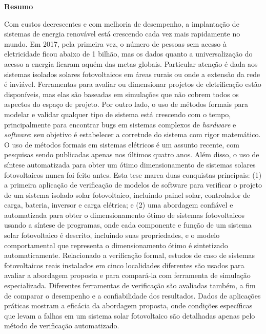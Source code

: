 \thispagestyle{plain}
\begin{center}
%    
%    
%    
    \vspace{0.9cm}
    \textbf{Resumo}
\end{center}
Com custos decrescentes e com melhoria de desempenho, a implantação de sistemas de energia renovável está crescendo cada vez mais rapidamente no mundo. Em 2017, pela primeira vez, o número de pessoas sem acesso à eletricidade ficou abaixo de 1 bilhão, mas os dados quanto a universalização do acesso a energia ficaram aquém das metas globais. Particular atenção é dada aos sistemas isolados solares fotovoltaicos em áreas rurais ou onde a extensão da rede é inviável. 
Ferramentas para avaliar ou dimensionar projetos de eletrificação estão disponíveis, mas elas são baseadas em simulações que não cobrem todos os aspectos do espaço de projeto. Por outro lado, o uso de métodos formais para modelar e validar qualquer tipo de sistema está crescendo com o tempo, principalmente para encontrar bugs em sistemas complexos de \textit{hardware} e \textit{software}: seu objetivo é estabelecer a corretude do sistema com rigor matemático. 
O uso de métodos formais em sistemas elétricos é um assunto recente, com pesquisas sendo publicadas apenas nos últimos quatro anos. Além disso, o uso de síntese automatizada para obter um ótimo dimensionamento de sistemas solares fotovoltaicos nunca foi feito antes. 
Esta tese marca duas conquistas principais: (1) a primeira aplicação de verificação de modelos de software para verificar o projeto de um sistema isolado solar fotovoltaico, incluindo painel solar, controlador de carga, bateria, inversor e carga elétrica; e (2) uma abordagem confiável e automatizada para obter o dimensionamento ótimo de sistemas fotovoltaicos usando a síntese de programas, onde cada componente e função de um sistema solar fotovoltaico é descrito, incluindo suas propriedades, e o modelo comportamental que representa o dimensionamento ótimo é sintetizado automaticamente. 
Relacionado a verificação formal, estudos de caso de sistemas fotovoltaicos reais instalados em cinco localidades diferentes são usados para avaliar a abordagem proposta e para compará-la com ferramenta de simulação especializada.
Diferentes ferramentas de verificação são avaliadas também, a fim de comparar o desempenho e a confiabilidade dos resultados. Dados de aplicações práticas mostram a eficácia da abordagem proposta, onde condições específicas que levam a falhas em um sistema solar fotovoltaico são detalhadas apenas pelo método de verificação automatizado. 
